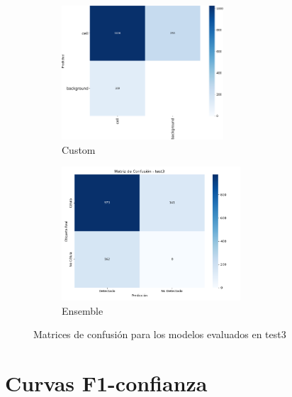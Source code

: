 \documentclass[12pt,a4paper,onecolumn,oneside]{report}
\begin{document}
\begin{figure}[H]
  \vspace{0.1cm}
  \begin{subfigure}[b]{0.45\textwidth}
    \centering
    \includegraphics[height=5cm]{figuras/resultados experimentacion/custom/test3/confusion_matrix.png}
    \vspace{-0.3cm}
    \caption{\footnotesize Custom}
    \label{fig:confusion_custom_test3}
  \end{subfigure}
  \hfill
  \begin{subfigure}[b]{0.45\textwidth}
    \centering
    \includegraphics[height=5cm]{figuras/resultados experimentacion/ensemble/confusion_matrices/confusion_matrix_test3.png}
    \vspace{-0.3cm}
    \caption{\footnotesize Ensemble}
    \label{fig:confusion_ensemble_test3}
  \end{subfigure}
  
  \vspace{-0.2cm}
  \caption{Matrices de confusión para los modelos evaluados en test3}
  \label{fig:confusion_matrices_test3}
\end{figure}

\section{Curvas F1-confianza}
\label{sec:Curvas F1-confianza}
\end{document}

